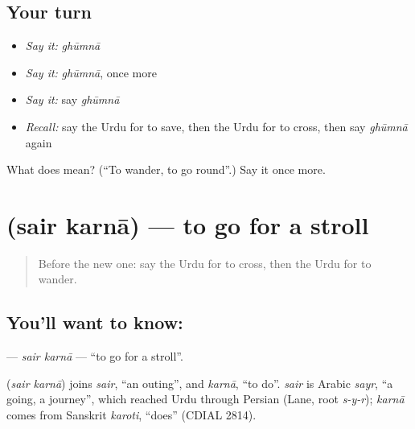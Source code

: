 \subsection*{Your turn}
\begin{itemize}
\raggedright
  \item \emph{Say it:} \emph{ghūmnā}
  \item \emph{Say it:} \emph{ghūmnā}, once more
  \item \emph{Say it:} say \emph{ghūmnā}
  \item \emph{Recall:} say the Urdu for to save, then the Urdu for to cross, then say \emph{ghūmnā} again
\end{itemize}

\begin{tcolorbox}[breakable,colback=teal!4,colframe=teal!35!black,title={Before you move on}]
What does  mean? (\textquotedblleft{}To wander, to go round\textquotedblright{}.) Say it once more.
\end{tcolorbox}
\section[\texorpdfstring{\ur{سیر} \ur{کرنا} (sair karnā)}{سیر کرنا (sair karnā)}]{  (sair karnā) — to go for a stroll}

\label{lesson:UR-C149-sair-karna}



\begin{quote}
Before the new one: say the Urdu for to cross, then the Urdu for to wander.
\end{quote}

\subsection*{You'll want to know:  }
\textbf{ } — \emph{sair karnā} — \textquotedblleft{}to go for a stroll\textquotedblright{}.

\begin{cousinweb}
\textbf{ } (\emph{sair karnā}) joins \emph{sair}, \textquotedblleft{}an outing\textquotedblright{}, and \emph{karnā}, \textquotedblleft{}to do\textquotedblright{}. \emph{sair} is Arabic \emph{sayr}, \textquotedblleft{}a going, a journey\textquotedblright{}, which reached Urdu through Persian (Lane, root \emph{s-y-r}); \emph{karnā} comes from Sanskrit \emph{karoti}, \textquotedblleft{}does\textquotedblright{} (CDIAL 2814).
\end{cousinweb}

